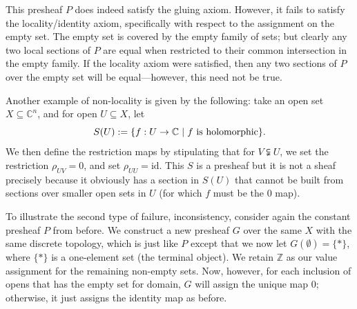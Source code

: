 \documentclass[11pt]{book}
\theoremstyle{definition}
\theoremstyle{definition}
\theoremstyle{definition}
\theoremstyle{theorem}
\theoremstyle{definition}
\begin{document}
This presheaf $P$ does indeed satisfy the gluing axiom. However, it fails to satisfy the locality/identity axiom, specifically with respect to the assignment on the empty set. The empty set is covered by the empty family of sets; but clearly any two local sections of $P$ are equal when restricted to their common intersection in the empty family. If the locality axiom were satisfied, then any two sections of $P$ over the empty set will be equal---however, this need not be true.\par  
Another example of non-locality is given by the following: take an open set $X \subseteq \mathbb{C}^n$, and for open $U \subseteq X$, let
\begin{equation}
S(U) := \{f: U \rightarrow \mathbb{C} \hspace*{0.3em}| \hspace*{0.3em} f \text{ is holomorphic} \}.
\end{equation}      
We then define the restriction maps by stipulating that for $V \subsetneqq U$, we set the restriction $\rho_{UV} = 0$, and set $\rho_{UU} = \text{id}$. This $S$ is a presheaf but it is not a sheaf precisely because it obviously has a section in $S(U)$ that cannot be built from sections over smaller open sets in $U$ (for which $f$ must be the $0$ map).\par 
To illustrate the second type of failure, inconsistency, consider again the constant presheaf $P$ from before. We construct a new presheaf $G$ over the same $X$ with the same discrete topology, which is just like $P$ except that we now let $G(\emptyset) = \{*\}$, where $\{*\}$ is a one-element set (the terminal object). We retain $\mathbb{Z}$ as our value assignment for the remaining non-empty sets. Now, however, for each inclusion of opens that has the empty set for domain, $G$ will assign the unique map $0$; otherwise, it just assigns the identity map as before.
\begin{center} 
\end{center} 
\end{document}
